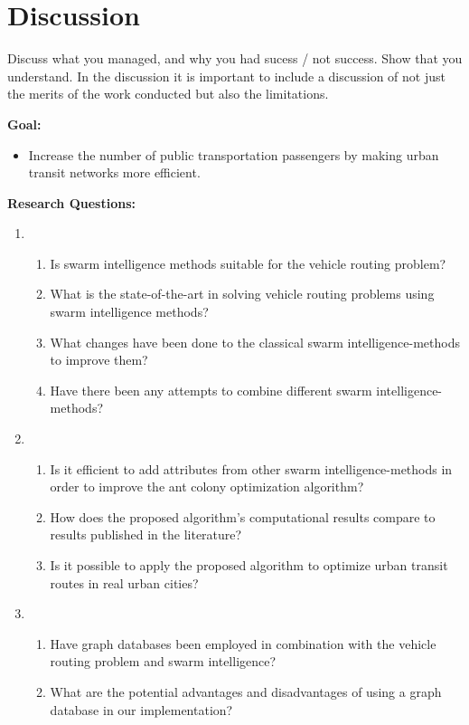 \section{Discussion}

Discuss what you managed, and why you had sucess / not success. Show that you understand. In the discussion it is important to include a discussion of not just the merits of the work conducted but also the limitations. 

\textbf{Goal:}
\begin{itemize}
\item  Increase the number of public transportation passengers by making urban transit networks more efficient.
\end{itemize}
\textbf{Research Questions:}
\begin{enumerate}[label=\textbf{\arabic*})]
\item 
    \begin{enumerate}
    \item  Is swarm intelligence methods suitable for the vehicle routing problem?
    \item  What is the state-of-the-art in solving vehicle routing problems using swarm intelligence methods?
    \item  What changes have been done to the classical swarm intelligence-methods to improve them?
    \item  Have there been any attempts to combine different swarm intelligence-methods?
	\end{enumerate}
\item
    \begin{enumerate}
    \item  Is it efficient to add attributes from other swarm intelligence-methods in order to improve the ant colony optimization algorithm?
    \item  How does the proposed algorithm's computational results compare to results published in the literature?
    \item  Is it possible to apply the proposed algorithm to optimize urban transit routes in real urban cities?
    \end{enumerate}
\item
	\begin{enumerate}
    \item  Have graph databases been employed in combination with the vehicle routing problem and swarm intelligence?
	\item  What are the potential advantages and disadvantages of using a graph database in our implementation?
    \end{enumerate}
\end{enumerate}

